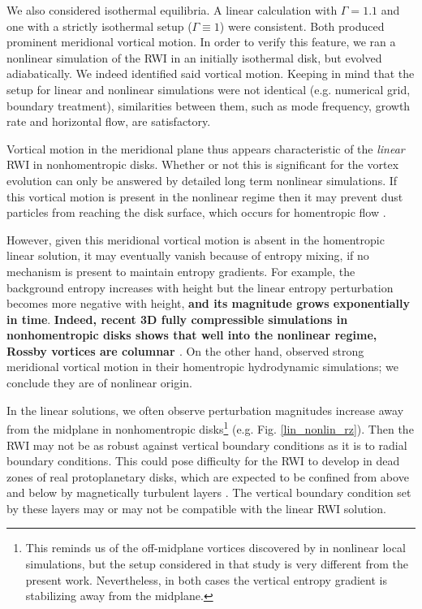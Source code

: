 We also considered isothermal equilibria. A linear calculation with 
$\Gamma=1.1$ and one with a strictly isothermal setup ($\Gamma\equiv
1$) were consistent. Both produced prominent meridional 
vortical motion. In order to verify this feature, we ran a nonlinear
simulation of the RWI in an initially isothermal disk, but evolved
adiabatically. We indeed identified said  vortical motion.    
Keeping in mind that the setup for linear and nonlinear simulations 
were not identical (e.g. numerical grid, boundary treatment), similarities
between them, such as mode frequency, growth rate and horizontal flow,
are satisfactory.  

Vortical motion in the meridional plane thus appears characteristic of 
the \emph{linear} RWI in nonhomentropic disks. Whether or not this is 
significant for the vortex evolution can only be answered by detailed 
long term nonlinear simulations. If this vortical motion is present 
in the nonlinear regime then it may prevent dust particles from reaching the disk surface, 
which occurs for homentropic flow \citep{meheut12c}. 

However, given this meridional vortical motion is absent in the homentropic 
linear solution, it may eventually vanish because of entropy
mixing, if no mechanism is present to maintain entropy gradients. 
For example, the background entropy increases with height but 
the linear entropy perturbation becomes more negative with height, {\bf 
and its magnitude grows exponentially in time}. 
{\bf Indeed,  recent 3D fully compressible simulations in
  nonhomentropic disks shows that well into the nonlinear regime,
  Rossby vortices are columnar
  \citep{richard13}}. On the other hand, \cite{meheut12} observed
strong meridional vortical motion in their homentropic hydrodynamic
simulations; we conclude they are of nonlinear origin.  

In the linear solutions, we often observe perturbation magnitudes
increase away from the midplane in nonhomentropic
disks\footnote{This reminds us of the off-midplane vortices
  discovered by \cite{barranco05} in nonlinear local simulations, 
  but the  
  setup considered in that study is very different from the
  present work. Nevertheless, in both cases the vertical entropy
  gradient is stabilizing away from the midplane. 
} 
(e.g. Fig. \ref{lin_nonlin_rz}). Then the RWI may not be as robust
against vertical boundary conditions as it is to radial boundary
conditions. This could pose difficulty for the RWI to develop in dead
zones of real protoplanetary disks, which are expected to be confined
from above and below by magnetically turbulent layers
\citep{oishi09}. The vertical boundary condition set by these layers
may or may not be compatible with the linear RWI solution.    


